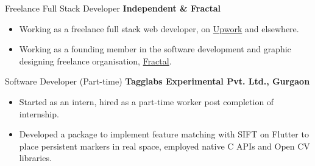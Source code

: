 {Freelance Full Stack Developer}
{\textbf{Independent \& Fractal}}
{
    \begin{itemize}
        \item Working as a freelance full stack web developer,
              on \href{https://www.upwork.com/freelancers/~015388e15d840b96cb}{Upwork} and elsewhere.
        \item Working as a founding member in the software
              development and graphic designing freelance
              organisation, \href{https://fractalweb.netlify.app/}{Fractal}.
    \end{itemize}
}
%
%
{Software Developer (Part-time)}
{\textbf{Tagglabs Experimental Pvt. Ltd., Gurgaon}}
{
    \begin{itemize}
        \item Started as an intern, hired as a part-time worker post completion of internship.
        \item Developed a package to implement feature
              matching with SIFT on Flutter to place persistent
              markers in real space, employed native C
              APIs and Open CV libraries.
    \end{itemize}
}
%
%